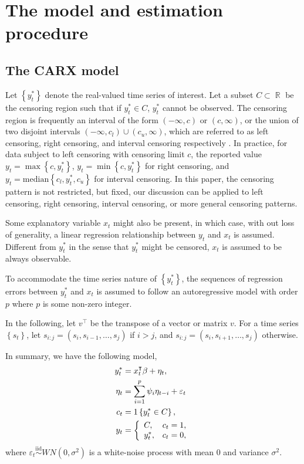 \documentclass[a4paper,12pt]{article}
\newcommand{\R}{\mathop{\mathbb{R}}}
\def \iid {\stackrel{\mathrm{iid}}{\sim}}
\def \median{\mbox{median}}
\def \trans{^\intercal}
\begin{document}
\section{ The model and estimation procedure\label{model}}
\subsection{The CARX model}
Let $\left\{ y_t^*\right\}$ denote the real-valued time series of interest.
Let a subset $C \subset \R$ be the censoring region such that if $y_t^*\in C$, $y_t^*$ cannot be observed.
The censoring region is frequently an interval of the form $(-\infty,c)$ or $(c,\infty)$, or the union of two disjoint intervals $(-\infty, c_l) \cup (c_u,\infty)$, which are referred to as left censoring, right censoring, and interval censoring respectively \citep{ParkGentonGhosh2007}. 
In practice, for data subject to left censoring with censoring limit $c$, the reported value $y_t = \max \left\{ c,y_t^* \right\}$, $y_t=\min\left\{ c,y_t^*\right\}$ for right censoring, and $y_t= \median\left\{ c_l,y_t^*,c_u \right\}$ for interval censoring.
In this paper, the censoring pattern is not restricted, but fixed, our discussion can be applied to left censoring, right censoring, interval censoring, or more general censoring patterns.

Some explanatory variable $x_t $ might also be present, in which case, with out loss of generality, a linear regression relationship between $y_t$ and $x_t$ is assumed.
Different from $y_t^*$ in the sense that $y_t^*$ might be censored, $x_t$ is assumed to be always observable.

To accommodate the time series nature of $\left\{ y_t^* \right\}$, the sequences of regression errors between $y_t^*$ and $x_t$ is assumed to follow an autoregressive model with order $p$ where $p$ is some non-zero integer.

In the following, let $v\trans$ be the transpose of a vector or matrix $v$. 
For a time series $\left\{ s_t \right\}$, let $s_{i:j} = (s_i,s_{i-1},\dots,s_{j})$ if $i>j$, and $s_{i:j} = (s_i,s_{i+1},\dots,s_{j}) $ otherwise.


In summary, we have the following model,
\begin{align}
y_t^* &= x_t\trans \beta + \eta_t,\label{regEqn}\\ 
\eta_t &= \sum_{i=1}^p \psi_i \eta_{t-i} + \varepsilon_t\label{arEqn}\\
c_t &= 1\left\{y_t^* \in C  \right\},\label{cenEqn}\\
y_t &= \left\{
\begin{array}[c]{ll}
C, &  c_t=1,\\
y_t^*,& c_t=0,
\end{array}\right.\label{yEqn}
\end{align}
where $\varepsilon_t \iid WN(0,\sigma^2)$ is a white-noise process with mean 0 and variance $\sigma^2$.
\end{document}
